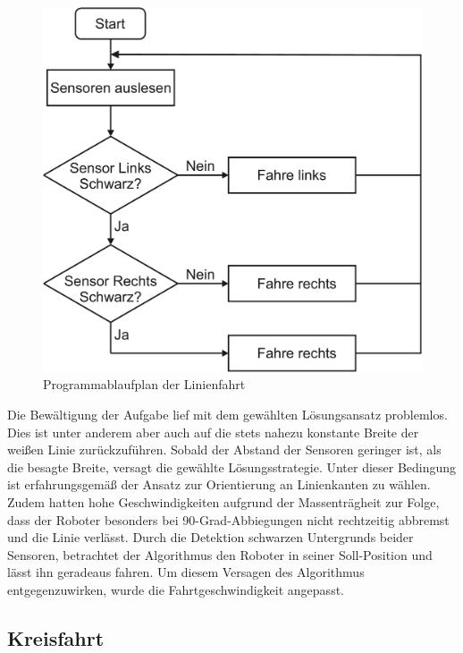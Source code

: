 \documentclass[12pt,a4paper,oneside]{article}
\begin{document}
\begin{spacing}{1.15}
\begin{figure}[!htb]
	\centering
	\includegraphics[scale=.3]{figs/PAP_Linie.pdf}
	\caption{Programmablaufplan der Linienfahrt}
	\label{fig:PAP_Linie}
\end{figure}


Die Bewältigung der Aufgabe lief mit dem gewählten Lösungsansatz problemlos. Dies ist unter anderem aber auch auf die stets nahezu konstante Breite der weißen Linie zurückzuführen. Sobald der Abstand der Sensoren geringer ist, als die besagte Breite, versagt die gewählte Lösungsstrategie. Unter dieser Bedingung ist erfahrungsgemäß der Ansatz zur Orientierung an Linienkanten zu wählen. \\
Zudem hatten hohe Geschwindigkeiten aufgrund der Massenträgheit zur Folge, dass der Roboter besonders bei 90-Grad-Abbiegungen nicht rechtzeitig abbremst und die Linie verlässt. Durch die Detektion schwarzen Untergrunds beider Sensoren, betrachtet der Algorithmus den Roboter in seiner Soll-Position und lässt ihn geradeaus fahren. Um diesem Versagen des Algorithmus entgegenzuwirken, wurde die Fahrtgeschwindigkeit angepasst.

	
\subsection{Kreisfahrt}


\end{spacing}
\end{document}
